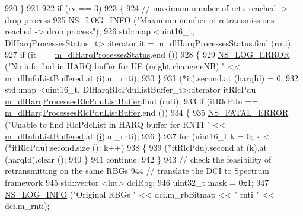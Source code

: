 \begin{DoxyCode}
920             \}
921 
922           \textcolor{keywordflow}{if} (rv == 3)
923             \{
924               \textcolor{comment}{// maximum number of retx reached -> drop process}
925               \hyperlink{group__logging_gafbd73ee2cf9f26b319f49086d8e860fb}{NS\_LOG\_INFO} (\textcolor{stringliteral}{"Maximum number of retransmissions reached -> drop process"});
926               std::map <uint16\_t, DlHarqProcessesStatus\_t>::iterator it = 
      \hyperlink{classns3_1_1FdTbfqFfMacScheduler_abc7e2984f379ab5a1855d815c439fa4f}{m\_dlHarqProcessesStatus}.find (rnti);
927               \textcolor{keywordflow}{if} (it == \hyperlink{classns3_1_1FdTbfqFfMacScheduler_abc7e2984f379ab5a1855d815c439fa4f}{m\_dlHarqProcessesStatus}.end ())
928                 \{
929                   \hyperlink{group__logging_ga0261a8db1d4ac5f79417d117634fd455}{NS\_LOG\_ERROR} (\textcolor{stringliteral}{"No info find in HARQ buffer for UE (might change eNB) "} << 
      \hyperlink{classns3_1_1FdTbfqFfMacScheduler_a72f4bdca7a08fcc26b1618bb9e2d0cf3}{m\_dlInfoListBuffered}.at (\hyperlink{bernuolliDistribution_8m_a6f6ccfcf58b31cb6412107d9d5281426}{i}).m\_rnti);
930                 \}
931               (*it).second.at (harqId) = 0;
932               std::map <uint16\_t, DlHarqRlcPduListBuffer\_t>::iterator itRlcPdu =  
      \hyperlink{classns3_1_1FdTbfqFfMacScheduler_ac885f8c49550f861905b5e790e346d7b}{m\_dlHarqProcessesRlcPduListBuffer}.find (rnti);
933               \textcolor{keywordflow}{if} (itRlcPdu == \hyperlink{classns3_1_1FdTbfqFfMacScheduler_ac885f8c49550f861905b5e790e346d7b}{m\_dlHarqProcessesRlcPduListBuffer}.end ())
934                 \{
935                   \hyperlink{group__fatal_ga5131d5e3f75d7d4cbfd706ac456fdc85}{NS\_FATAL\_ERROR} (\textcolor{stringliteral}{"Unable to find RlcPdcList in HARQ buffer for RNTI "} << 
      \hyperlink{classns3_1_1FdTbfqFfMacScheduler_a72f4bdca7a08fcc26b1618bb9e2d0cf3}{m\_dlInfoListBuffered}.at (\hyperlink{bernuolliDistribution_8m_a6f6ccfcf58b31cb6412107d9d5281426}{i}).m\_rnti);
936                 \}
937               \textcolor{keywordflow}{for} (uint16\_t k = 0; k < (*itRlcPdu).second.size (); k++)
938                 \{
939                   (*itRlcPdu).second.at (k).at (harqId).clear ();
940                 \}
941               \textcolor{keywordflow}{continue};
942             \}
943           \textcolor{comment}{// check the feasibility of retransmitting on the same RBGs}
944           \textcolor{comment}{// translate the DCI to Spectrum framework}
945           std::vector <int> dciRbg;
946           uint32\_t mask = 0x1;
947           \hyperlink{group__logging_gafbd73ee2cf9f26b319f49086d8e860fb}{NS\_LOG\_INFO} (\textcolor{stringliteral}{"Original RBGs "} << dci.m\_rbBitmap << \textcolor{stringliteral}{" rnti "} << dci.m\_rnti);

\end{DoxyCode}
